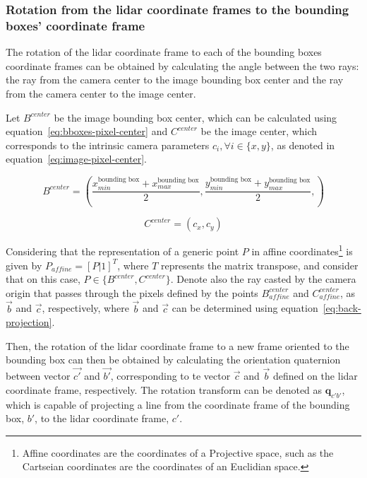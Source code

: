 \subsubsection{Rotation from the \ac{lidar} coordinate frames to the bounding boxes' coordinate frame}
The rotation of the \ac{lidar} coordinate frame to each of the bounding boxes coordinate frames can be obtained by calculating the angle between the two rays: the ray from the camera center to the image bounding box center and the ray from the camera center to the image center. 

Let $B^{center}$ be the image bounding box center, which can be calculated using equation~\ref{eq:bboxes-pixel-center} and $C^{center}$ be the image center, which corresponds to the intrinsic camera parameters $c_i, \forall i \in \{x, y\}$, as denoted in equation~\ref{eq:image-pixel-center}.

\begin{equation}
	\label{eq:bboxes-pixel-center}	
B^{center} = \left(\frac{x^{\text{bounding box}}_{min} + x^{\text{bounding box}}_{max}}{2}, \frac{y^{\text{bounding box}}_{min} + y^{\text{bounding box}}_{max}}{2},\right)
\end{equation}

\begin{equation}
\label{eq:image-pixel-center}
C^{center} = (c_x, c_y)
\end{equation}

Considering that the representation of a generic point $P$ in affine coordinates\footnote{Affine coordinates are the coordinates of a Projective space, such as the Cartseian coordinates are the coordinates of an Euclidian space.} is given by $P_{affine} = \left[P | 1\right]^T$, where $T$ represents the matrix transpose, and consider that on this case, $P \in \{B^{center}, C^{center}\}$. Denote also the ray casted by the camera origin that passes through the pixels defined by the points $B^{center}_{affine}$ and $C^{center}_{affine}$, as $\vec{b}$ and $\vec{c}$, respectively, where  $\vec{b}$ and $\vec{c}$ can be determined using equation~\ref{eq:back-projection}.

Then, the rotation of the \ac{lidar} coordinate frame to a new frame oriented to the bounding box can then be obtained by calculating the orientation quaternion between vector $\vec{c'}$ and $\vec{b'}$, corresponding to te vector $\vec{c}$ and $\vec{b}$ defined on the \ac{lidar} coordinate frame, respectively. The rotation transform can be denoted as $\mathbf{q}_{c'b'}$, which is capable of projecting a line from the coordinate frame of the bounding box, $b'$, to the \ac{lidar} coordinate frame, $c'$.

